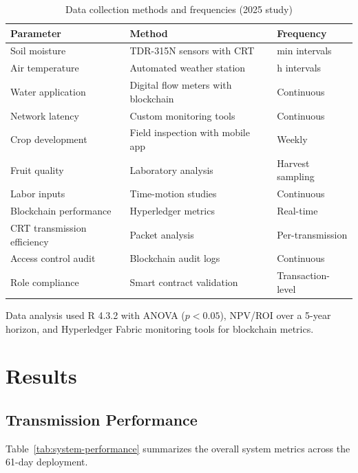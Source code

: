 \documentclass[pdflatex,sn-mathphys-num]{sn-jnl}
\theoremstyle{thmstyleone}
\theoremstyle{thmstyletwo}
\theoremstyle{thmstylethree}
\begin{document}
\begin{table}[htbp]
\centering
\caption{Data collection methods and frequencies (2025 study)}
\label{tab:data-collection}
\footnotesize
\begin{tabularx}{\columnwidth}{
    >{\raggedright\arraybackslash}p{}
    >{\raggedright\arraybackslash}p{}
    >{\centering\arraybackslash}p{}
}
\toprule
\textbf{Parameter} & \textbf{Method} & \textbf{Frequency} \\
\midrule
Soil moisture & TDR-315N sensors with CRT & 30 min intervals \\
Air temperature & Automated weather station & 1 h intervals \\
Water application & Digital flow meters with blockchain & Continuous \\
Network latency & Custom monitoring tools & Continuous \\
Crop development & Field inspection with mobile app & Weekly \\
Fruit quality & Laboratory analysis & Harvest sampling \\
Labor inputs & Time-motion studies & Continuous \\
Blockchain performance & Hyperledger metrics & Real-time \\
CRT transmission efficiency & Packet analysis & Per-transmission \\
Access control audit & Blockchain audit logs & Continuous \\
Role compliance & Smart contract validation & Transaction-level \\
\bottomrule
\end{tabularx}
\end{table}

Data analysis used R 4.3.2 with ANOVA ($p < 0.05$), NPV/ROI over a 5-year horizon, and Hyperledger Fabric monitoring tools for blockchain metrics.

\section{Results}
\label{sec:results}

\subsection{Transmission Performance}
\label{subsec:transmission_performance}

Table~\ref{tab:system-performance} summarizes the overall system metrics across the 61-day deployment.
\end{document}
